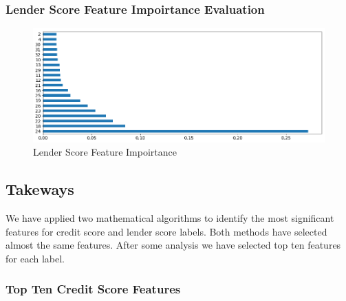 \hypertarget{lender-score-feature-impoirtance-evaluation}{%
\subsubsection{Lender Score Feature Impoirtance
Evaluation}\label{lender-score-feature-impoirtance-evaluation}}

\begin{Schunk}
\begin{figure}[H]

{\centering \includegraphics[width=1\linewidth]{../../artifacts/lfimportance} 

}

\caption[Lender Score Feature Impoirtance]{Lender Score Feature Impoirtance}\label{fig:lfi}
\end{figure}
\end{Schunk}

\hypertarget{takeways}{%
\subsection{Takeways}\label{takeways}}

We have applied two mathematical algorithms to identify the most
significant features for credit score and lender score labels. Both
methods have selected almost the same features. After some analysis we
have selected top ten features for each label.

\hypertarget{top-ten-credit-score-features}{%
\subsubsection{Top Ten Credit Score
Features}\label{top-ten-credit-score-features}}


